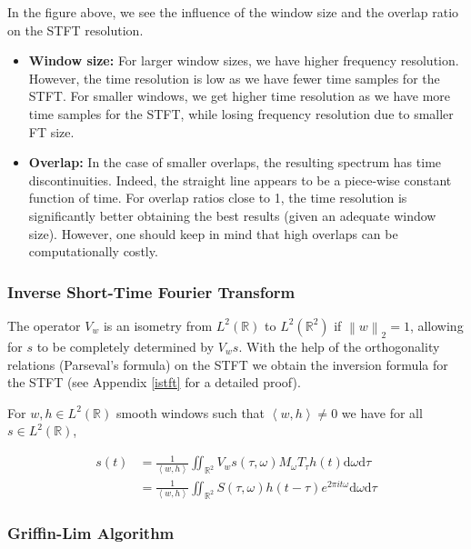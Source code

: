 \documentclass[american,]{article}
\providecommand{\tightlist}{%
  \setlength{\itemsep}{0pt}\setlength{\parskip}{0pt}}
\theoremstyle{definition}
\theoremstyle{definition}
\theoremstyle{definition}
\theoremstyle{remark}
\begin{document}
In the figure above, we see the influence of the window size and the overlap ratio on the
STFT resolution.

\begin{itemize}
\tightlist
\item
  \textbf{Window size:}
  For larger window sizes, we have higher frequency resolution. However, the time resolution is low as we have fewer time samples for the STFT.
  For smaller windows, we get higher time resolution as we have more time samples for the STFT, while losing frequency resolution due to smaller FT size.
\item
  \textbf{Overlap:}
  In the case of smaller overlaps, the resulting spectrum has time discontinuities. Indeed, the straight line appears to be a piece-wise constant function of time.
  For overlap ratios close to 1, the time resolution is significantly better obtaining the best results (given an adequate window size). However, one should keep in mind that high overlaps can be computationally costly.
\end{itemize}

\hypertarget{inverse-short-time-fourier-transform}{%
\subsubsection{Inverse Short-Time Fourier Transform}\label{inverse-short-time-fourier-transform}}

The operator \(V_w\) is an isometry from \(L^2(\mathbb{R})\) to \(L^2(\mathbb{R}^2)\)
if \(\left\lVert w\right\rVert_2=1\),
allowing for \(s\) to be completely determined by \(V_w s\).
With the help of the orthogonality relations (Parseval's formula) on the STFT we obtain
the inversion formula for the STFT (see Appendix \ref{istft} for a detailed proof).

For \(w,h\in L^2(\mathbb{R})\) smooth windows such that \(\left\langle w,h\right\rangle\neq 0\)
we have for all \(s\in L^2(\mathbb{R})\),

\begin{align}
s(t) &=\frac{1}{\left\langle w,h\right\rangle} \iint_{\mathbb{R}^2}V_w s(\tau,\omega)M_\omega T_\tau h(t) \mathrm{d}\omega\mathrm{d}\tau\\
     &= \frac{1}{\left\langle w,h\right\rangle}
        \iint_{\mathbb{R}^2} S(\tau,\omega) h(t-\tau) e^{2\pi it\omega} \mathrm{d}\omega\mathrm{d}\tau
\end{align}

\hypertarget{griffin-lim-algorithm}{%
\subsubsection{Griffin-Lim Algorithm}\label{griffin-lim-algorithm}}
\end{document}
